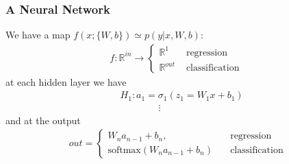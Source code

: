 \documentclass{beamer}
\begin{document}
\begin{frame}
\frametitle{A Neural Network}
We have a map $f(x;\{W,b\}) \simeq p(y|x,W,b)$:
\begin{align}
	f: \mathbb{R}^{in} \rightarrow \begin{cases}
	\mathbb{R}^{1} &\text{ regression }\\
	\mathbb{R}^{out} &\text{ classification }
	\end{cases}
\end{align}
at each hidden layer we have
\begin{align}
	&H_1: a_1 = \sigma_1 ( z_1 = W_1 x + b_1) \\
	& \qquad \qquad \vdots \nonumber
\end{align}
and at the output
\begin{align}
out = 
	\begin{cases}
	W_n a_{n-1} + b_{n}, \quad &\text{regression} \\
	\text{softmax}(W_n a_{n-1} + b_{n}) \quad &\text{classification}
	\end{cases}
\end{align}
\end{frame}
\end{document}
